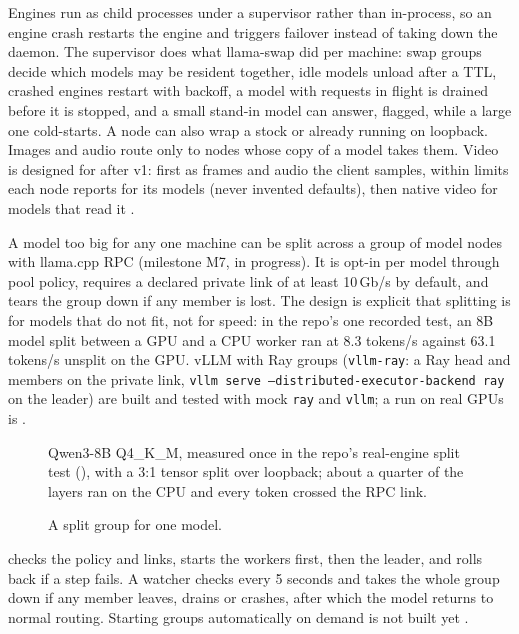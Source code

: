 Engines run as child processes under a supervisor rather than in-process, so an engine crash
restarts the engine and triggers failover instead of taking down the daemon. The supervisor does
what llama-swap did per machine: swap groups decide which models may be resident together, idle
models unload after a TTL, crashed engines restart with backoff, a model with requests in flight
is drained before it is stopped, and a small stand-in model can answer, flagged, while a large one
cold-starts. A node can also wrap a stock  or  already running
on loopback. Images and audio route only to nodes whose copy of a model takes them. Video is designed
for after v1: first as frames and audio the client samples, within limits each node reports for its
models (never invented defaults), then native video for models that read it \planned.

A model too big for any one machine can be split across a group of model nodes with llama.cpp RPC
(milestone M7, in progress). It is opt-in per model through pool policy, requires a declared
private link of at least 10\,Gb/s by default, and tears the group down if any member is lost. The
design is explicit that splitting is for models that do not fit, not for speed: in the repo's one
recorded test, an 8B model split between a GPU and a CPU worker ran at 8.3 tokens/s against 63.1
tokens/s unsplit on the GPU. vLLM with Ray groups (\texttt{vllm-ray}: a Ray head and members on the private link, \texttt{vllm serve --distributed-executor-backend ray} on the leader) are built and tested with mock \texttt{ray} and \texttt{vllm}; a run on real GPUs is \planned.

\begin{figure}[htbp]
\centering
{}
\caption{Qwen3-8B Q4\_K\_M, measured once in the repo's real-engine split test
(), with a 3:1 tensor split over loopback; about a quarter of the layers ran
on the CPU and every token crossed the RPC link.}
\end{figure}

\begin{figure}[htbp]
\centering
{}
\caption{A split group for one model.}
\end{figure}

 checks the policy and links, starts the workers first, then the leader,
and rolls back if a step fails. A watcher checks every 5 seconds and takes the whole group down if
any member leaves, drains or crashes, after which the model returns to normal routing. Starting
groups automatically on demand is not built yet \planned.

